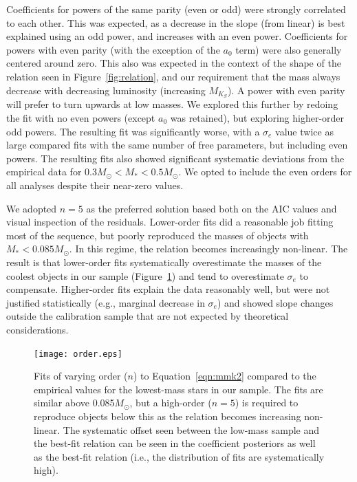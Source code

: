 \documentclass[twocolumn]{aastex62}
\newcommand{\mks}{$M_{K_S}$}
\newcommand{\order}{5}
\begin{document}
Coefficients for powers of the same parity (even or odd) were strongly correlated to each other. This was expected, as a decrease in the slope (from linear) is best explained using an odd power, and increases with an even power. Coefficients for powers with even parity (with the exception of the $a_0$ term) were also generally centered around zero. This also was expected in the context of the shape of the relation seen in Figure~\ref{fig:relation}, and our requirement that the mass always decrease with decreasing luminosity (increasing \mks). A power with even parity will prefer to turn upwards at low masses. We explored this further by redoing the fit with no even powers (except $a_0$ was retained), but exploring higher-order odd powers. The resulting fit was significantly worse, with a $\sigma_e$ value twice as large compared fits with the same number of free parameters, but including even powers. The resulting fits also showed significant systematic deviations from the empirical data for $0.3M_\odot<M_*<0.5M_\odot$. We opted to include the even orders for all analyses despite their near-zero values. 

We adopted $n=\order$ as the preferred solution based both on the AIC values and visual inspection of the residuals. Lower-order fits did a reasonable job fitting most of the sequence, but poorly reproduced the masses of objects with $M_*<0.085M_\odot$. In this regime, the relation becomes increasingly non-linear. The result is that lower-order fits systematically overestimate the masses of the coolest objects in our sample (Figure~\ref{fig:order}) and tend to overestimate $\sigma_e$ to compensate. Higher-order fits explain the data reasonably well, but were not justified statistically (e.g., marginal decrease in $\sigma_e$) and showed slope changes outside the calibration sample that are not expected by theoretical considerations. 

\begin{figure}[h]
\begin{center}
\texttt{[image: order.eps]}
\caption{Fits of varying order ($n$) to Equation~\ref{eqn:mmk2} compared to the empirical values for the lowest-mass stars in our sample. The fits are similar above 0.085$M_\odot$, but a high-order ($n=\order$) is required to reproduce objects below this as the relation becomes increasing non-linear. The systematic offset seen between the low-mass sample and the best-fit relation can be seen in the coefficient posteriors as well as the best-fit relation (i.e., the distribution of fits are systematically high). }
\label{fig:order}
\end{center}
\end{figure}
\end{document}
